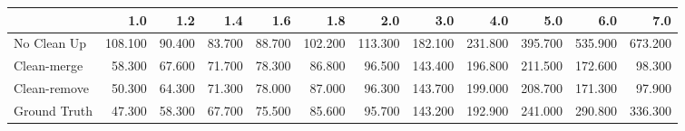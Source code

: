 \begin{tabular}{lrrrrrrrrrrr}
\toprule
{} &     1.0 &    1.2 &    1.4 &    1.6 &     1.8 &     2.0 &     3.0 &     4.0 &     5.0 &     6.0 &     7.0 \\
\midrule
No Clean Up  & 108.100 & 90.400 & 83.700 & 88.700 & 102.200 & 113.300 & 182.100 & 231.800 & 395.700 & 535.900 & 673.200 \\
Clean-merge  &  58.300 & 67.600 & 71.700 & 78.300 &  86.800 &  96.500 & 143.400 & 196.800 & 211.500 & 172.600 &  98.300 \\
Clean-remove &  50.300 & 64.300 & 71.300 & 78.000 &  87.000 &  96.300 & 143.700 & 199.000 & 208.700 & 171.300 &  97.900 \\
Ground Truth &  47.300 & 58.300 & 67.700 & 75.500 &  85.600 &  95.700 & 143.200 & 192.900 & 241.000 & 290.800 & 336.300 \\
\bottomrule
\end{tabular}
